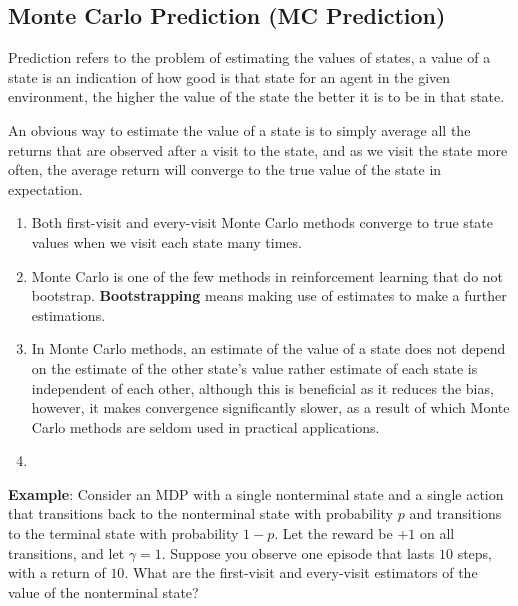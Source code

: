 \subsection{Monte Carlo Prediction (MC Prediction) \cite{medium/nerd-for-tech/monte-carlo-methods-for-reinforcement-learning-d30d874dd817}} \label{Monte Carlo Prediction}

Prediction refers to the problem of estimating the values of states, a value of a state is an indication of how good is that state for an agent in the given environment, the higher the value of the state the better it is to be in that state.

An obvious way to estimate the value of a state is to simply average all the returns that are observed after a visit to the state, and as we visit the state more often, the average return will converge to the true value of the state in expectation.

\begin{enumerate}
    \item Both first-visit and every-visit Monte Carlo methods converge to true state values when we visit each state many times.

    \item Monte Carlo is one of the few methods in reinforcement learning that do not bootstrap. \textbf{Bootstrapping}\label{RL: Bootstrapping} means making use of estimates to make a further estimations.

    \item In Monte Carlo methods, an estimate of the value of a state does not depend on the estimate of the other state's value rather estimate of each state is independent of each other, although this is beneficial as it reduces the bias, however, it makes convergence significantly slower, as a result of which Monte Carlo methods are seldom used in practical applications.

    \item 

\end{enumerate} 

\vspace{0.2cm}
\textbf{Example}: Consider an MDP with a single nonterminal state and a single action that transitions back to the nonterminal state with probability $p$ and transitions to the terminal state with probability $1-p$. Let the reward be $+1$ on all transitions, and let $\gamma=1$. Suppose you observe one episode that lasts $10$ steps, with a return of $10$. What are the first-visit and every-visit estimators of the value of the nonterminal state?


